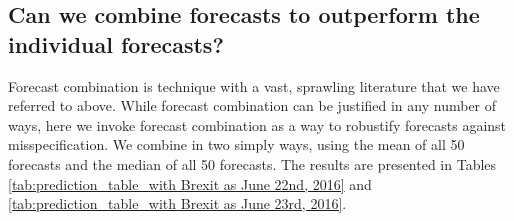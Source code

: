 \documentclass[11pt,3p,review,authoryear]{elsarticle}
\theoremstyle{definition}
\begin{document}

\subsection{Can we combine forecasts to outperform the individual forecasts?}\label{forecastcomb}

Forecast combination is technique with a vast, sprawling literature that we have referred to above.  While forecast combination can be justified in any number of ways, here we invoke forecast combination as a way to robustify forecasts against misspecification.  We combine in two simply ways, using the mean of all 50 forecasts and the median of all 50 forecasts.  The results are presented in Tables \ref{tab:prediction_table_with Brexit as June 22nd, 2016} and \ref{tab:prediction_table_with Brexit as June 23rd, 2016}. 



  
\end{document}
